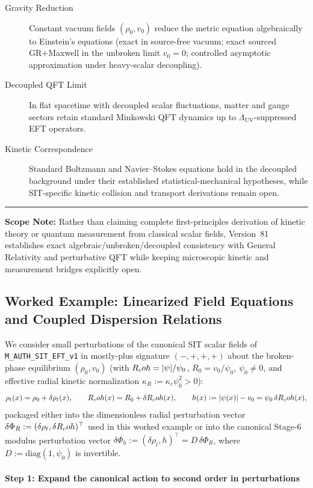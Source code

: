 \begin{description}
    \item[Gravity Reduction] Constant vacuum fields $(\rho_0, v_0)$ reduce the metric equation algebraically to Einstein's equations (exact in source-free vacuum; exact sourced GR+Maxwell in the unbroken limit $v_0 = 0$; controlled asymptotic approximation under heavy-scalar decoupling).
    \item[Decoupled QFT Limit] In flat spacetime with decoupled scalar fluctuations, matter and gauge sectors retain standard Minkowski QFT dynamics up to $\Lambda_{\mathrm{UV}}$-suppressed EFT operators.
    \item[Kinetic Correspondence] Standard Boltzmann and Navier--Stokes equations hold in the decoupled background under their established statistical-mechanical hypotheses, while SIT-specific kinetic collision and transport derivations remain open.
\end{description}

\medskip\hrule\medskip
\noindent\textbf{Scope Note:} Rather than claiming complete first-principles derivation of kinetic theory or quantum measurement from classical scalar fields, Version~81 establishes exact algebraic/unbroken/decoupled consistency with General Relativity and perturbative QFT while keeping microscopic kinetic and measurement bridges explicitly open.

\subsection{Worked Example: Linearized Field Equations and Coupled Dispersion Relations}

We consider small perturbations of the canonical SIT scalar fields of \texttt{M\_AUTH\_SIT\_EFT\_v1} in mostly-plus signature $(-,+,+,+)$ about the broken-phase equilibrium $(\rho_0, v_0)$ (with $R_coh = |\psi|/\psi_0$, $R_0 = v_0/\psi_0$, $\psi_0 \ne 0$, and effective radial kinetic normalization $\kappa_R := \kappa_c\psi_0^2 > 0$):
\[
\rho_t(x) = \rho_0 + \delta \rho_t(x), \qquad R_coh(x) = R_0 + \delta R_coh(x), \qquad h(x) := |\psi(x)| - v_0 = \psi_0\,\delta R_coh(x),
\]
packaged either into the dimensionless radial perturbation vector $\delta\Phi_R := (\delta\rho_t, \delta R_coh)^\top$ used in this worked example or into the canonical Stage-6 modulus perturbation vector $\delta\Phi_h := (\delta\rho_t, h)^\top = D\,\delta\Phi_R$, where $D := \mathrm{diag}(1, \psi_0)$ is invertible.

\paragraph{Step 1: Expand the canonical action to second order in perturbations}

